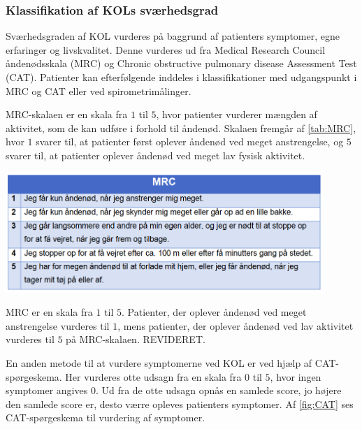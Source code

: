 \subsubsection{Klassifikation af KOLs sværhedsgrad}
Sværhedsgraden af KOL vurderes på baggrund af patienters symptomer, egne erfaringer og livskvalitet. Denne vurderes ud fra Medical Research Council åndenødsskala (MRC) og Chronic obstructive pulmonary disease Assessment Test (CAT). Patienter kan efterfølgende inddeles i klassifikationer med udgangspunkt i MRC og CAT eller ved spirometrimålinger.\cite{Basisbogen2016}

 
MRC-skalaen er en skala fra $1$ til $5$, hvor patienter vurderer mængden af aktivitet, som de kan udføre i forhold til åndenød. Skalaen fremgår af \autoref{tab:MRC}, hvor $1$ svarer til, at patienter først oplever åndenød ved meget anstrengelse, og $5$ svarer til, at patienter oplever åndenød ved meget lav fysisk aktivitet.\cite{Basisbogen2016}

\begin{table} [H]
\centering
\includegraphics[width=0.9\textwidth]{figures/MRC}
\caption{MRC er en skala fra $1$ til $5$. Patienter, der oplever åndenød ved meget anstrengelse vurderes til $1$, mens patienter, der oplever åndenød ved lav aktivitet vurderes til $5$ på MRC-skalaen. REVIDERET\cite{Basisbogen2016}.}
\label{tab:MRC}
\end{table} 

\noindent
En anden metode til at vurdere symptomerne ved KOL er ved hjælp af CAT-spørgeskema. Her vurderes otte udsagn fra en skala fra $0$ til $5$, hvor ingen symptomer angives $0$. Ud fra de otte udsagn opnås en samlede score, jo højere den samlede score er, desto værre opleves patienters symptomer. Af \autoref{fig:CAT} ses CAT-spørgeskema til vurdering af symptomer.\cite{dsam2016,Basisbogen2016}

